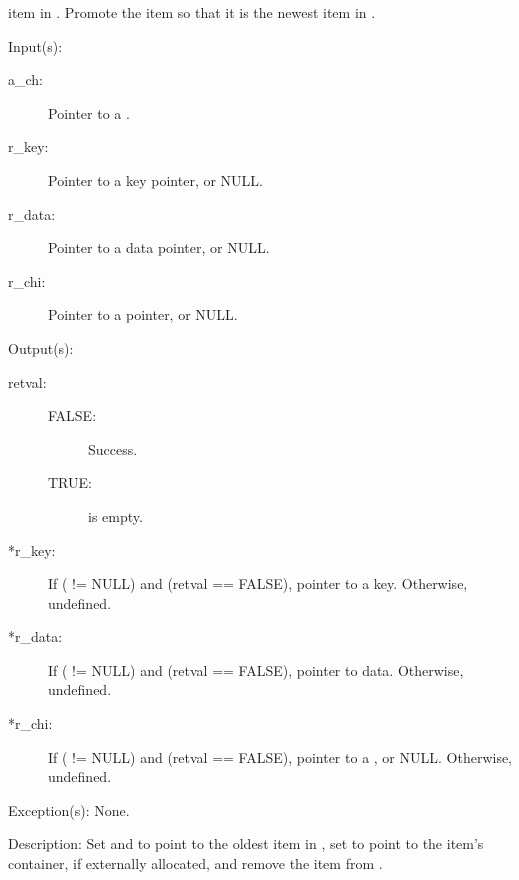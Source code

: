 \begin{capi}
\begin{capilist}
		item in .  Promote the item so that it is the newest
		item in .
	\end{capilist}
\label{ch_remove_iterate}
	\begin{capilist}
	\item[Input(s): ]
		\begin{description}\item[]
		\item[a\_ch: ]
			Pointer to a .
		\item[r\_key: ]
			Pointer to a key pointer, or NULL.
		\item[r\_data: ]
			Pointer to a data pointer, or NULL.
		\item[r\_chi: ]
			Pointer to a  pointer, or NULL.
		\end{description}
	\item[Output(s): ]
		\begin{description}\item[]
		\item[retval: ]
			\begin{description}\item[]
			\item[FALSE: ]
				Success.
			\item[TRUE: ]
				 is empty.
			\end{description}
		\item[*r\_key: ]
			If ( != NULL) and (retval == FALSE),
			pointer to a key.  Otherwise, undefined.
		\item[*r\_data: ]
			If ( != NULL) and (retval == FALSE),
			pointer to data.  Otherwise, undefined.
		\item[*r\_chi: ]
			If ( != NULL) and (retval == FALSE),
			pointer to a , or NULL.  Otherwise,
			undefined.
		\end{description}
	\item[Exception(s): ] None.
	\item[Description: ]
		Set  and  to point to the oldest
		item in , set  to point to the item's
		container, if externally allocated, and remove the item from
		.
	\end{capilist}
\label{ch_string_hash}

\end{capi}
